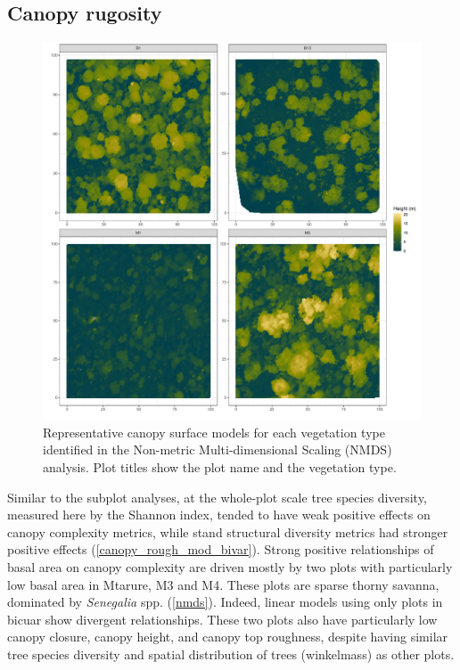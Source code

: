 \documentclass[11pt,a4paper]{article}
\begin{document}
%

\subsection{Canopy rugosity}

\begin{figure}
	\includegraphics[width=\textwidth]{veg_type_tile}
	\caption{Representative canopy surface models for each vegetation type identified in the Non-metric Multi-dimensional Scaling (NMDS) analysis. Plot titles show the plot name and the vegetation type.}
	\label{veg_type_tile}
\end{figure}

Similar to the subplot analyses, at the whole-plot scale tree species diversity, measured here by the Shannon index, tended to have weak positive effects on canopy complexity metrics, while stand structural diversity metrics had stronger positive effects (\autoref{canopy_rough_mod_bivar}). Strong positive relationships of basal area on canopy complexity are driven mostly by two plots with particularly low basal area in Mtarure, M3 and M4. These plots are sparse thorny savanna, dominated by \textit{Senegalia} spp. (\autoref{nmds}). Indeed, linear models using only plots in bicuar show divergent relationships. These two plots also have particularly low canopy closure, canopy height, and canopy top roughness, despite having similar tree species diversity and spatial distribution of trees (winkelmass) as other plots.
\end{document}
